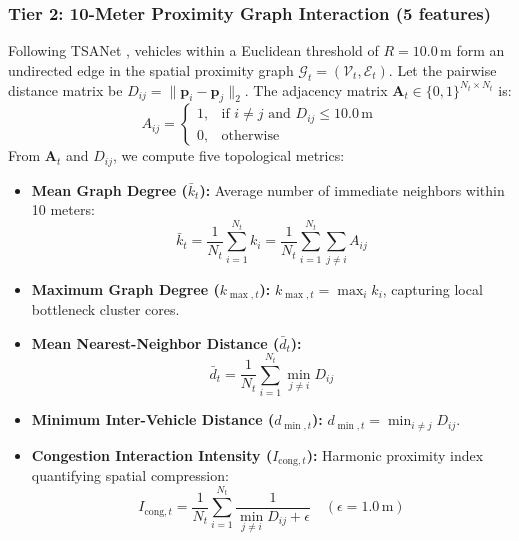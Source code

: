 \documentclass[conference]{IEEEtran}
\begin{document}
\subsubsection{Tier 2: 10-Meter Proximity Graph Interaction (5 features)}
Following TSANet \cite{kumar2024tsanet}, vehicles within a Euclidean threshold of $R = 10.0\,\text{m}$ form an undirected edge in the spatial proximity graph $\mathcal{G}_t = (\mathcal{V}_t, \mathcal{E}_t)$. Let the pairwise distance matrix be $D_{ij} = \|\mathbf{p}_i - \mathbf{p}_j\|_2$. The adjacency matrix $\mathbf{A}_t \in \{0, 1\}^{N_t \times N_t}$ is:
\begin{equation}
    A_{ij} = \begin{cases} 
    1, & \text{if } i \neq j \text{ and } D_{ij} \le 10.0\,\text{m} \\ 
    0, & \text{otherwise} 
    \end{cases}
\end{equation}
From $\mathbf{A}_t$ and $D_{ij}$, we compute five topological metrics:
\begin{itemize}
    \item \textbf{Mean Graph Degree ($\bar{k}_t$):} Average number of immediate neighbors within 10 meters:
    \begin{equation}
        \bar{k}_t = \frac{1}{N_t}\sum_{i=1}^{N_t} k_i = \frac{1}{N_t}\sum_{i=1}^{N_t} \sum_{j \neq i} A_{ij}
    \end{equation}
    \item \textbf{Maximum Graph Degree ($k_{\max, t}$):} $k_{\max, t} = \max_{i} k_i$, capturing local bottleneck cluster cores.
    \item \textbf{Mean Nearest-Neighbor Distance ($\bar{d}_t$):}
    \begin{equation}
        \bar{d}_t = \frac{1}{N_t} \sum_{i=1}^{N_t} \min_{j \neq i} D_{ij}
    \end{equation}
    \item \textbf{Minimum Inter-Vehicle Distance ($d_{\min, t}$):} $d_{\min, t} = \min_{i \neq j} D_{ij}$.
    \item \textbf{Congestion Interaction Intensity ($I_{\text{cong}, t}$):} Harmonic proximity index quantifying spatial compression:
    \begin{equation}
        I_{\text{cong}, t} = \frac{1}{N_t} \sum_{i=1}^{N_t} \frac{1}{\min_{j \neq i} D_{ij} + \epsilon} \quad (\epsilon = 1.0\,\text{m})
    \end{equation}
\end{itemize}
\end{document}

